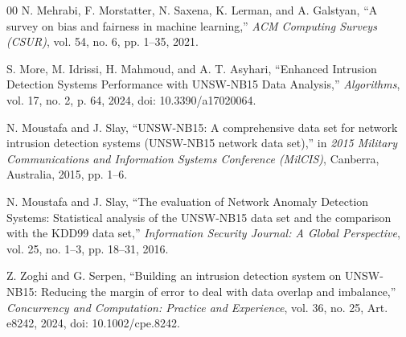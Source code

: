\documentclass[conference]{IEEEtran}
\begin{document}
\begin{thebibliography}{00}
N. Mehrabi, F. Morstatter, N. Saxena, K. Lerman, and A. Galstyan,
``A survey on bias and fairness in machine learning,''
\textit{ACM Computing Surveys (CSUR)},
vol. 54, no. 6, pp. 1--35, 2021.

S. More, M. Idrissi, H. Mahmoud, and A. T. Asyhari,
``Enhanced Intrusion Detection Systems Performance with UNSW-NB15 Data Analysis,''
\textit{Algorithms},
vol. 17, no. 2, p. 64, 2024, doi: 10.3390/a17020064.

N. Moustafa and J. Slay,
``UNSW-NB15: A comprehensive data set for network intrusion detection systems (UNSW-NB15 network data set),''
in \textit{2015 Military Communications and Information Systems Conference (MilCIS)},
Canberra, Australia, 2015, pp. 1--6.

N. Moustafa and J. Slay,
``The evaluation of Network Anomaly Detection Systems: Statistical analysis of the UNSW-NB15 data set and the comparison with the KDD99 data set,''
\textit{Information Security Journal: A Global Perspective},
vol. 25, no. 1--3, pp. 18--31, 2016.


Z. Zoghi and G. Serpen,
``Building an intrusion detection system on UNSW-NB15:
Reducing the margin of error to deal with data overlap and imbalance,''
\textit{Concurrency and Computation: Practice and Experience},
vol. 36, no. 25, Art. e8242, 2024,
doi: 10.1002/cpe.8242.

\end{thebibliography}
\end{document}
